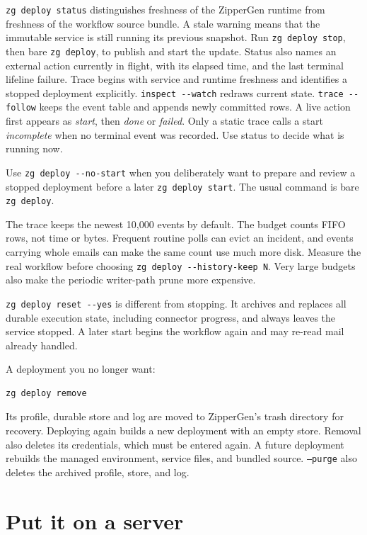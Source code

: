 \documentclass[11pt,a4paper]{article}
\begin{document}
\texttt{zg deploy status} distinguishes freshness of the ZipperGen runtime
from freshness of the workflow source bundle. A stale warning means that the
immutable service is still running its previous snapshot. Run \texttt{zg
deploy stop}, then bare \texttt{zg deploy}, to publish and start the update.
Status also names an external action currently in flight, with its elapsed
time, and the last terminal lifeline failure. Trace begins with service and
runtime freshness and identifies a stopped deployment explicitly.
\texttt{inspect -{}-watch} redraws current state. \texttt{trace -{}-follow}
keeps the event table and appends newly committed rows. A live action first
appears as \emph{start}, then \emph{done} or \emph{failed}. Only a static trace
calls a start \emph{incomplete} when no terminal event was recorded. Use status
to decide what is running now.

Use \texttt{zg deploy -{}-no-start} when you deliberately want to prepare and
review a stopped deployment before a later \texttt{zg deploy start}. The usual
command is bare \texttt{zg deploy}.

The trace keeps the newest 10,000 events by default. The budget counts FIFO
rows, not time or bytes. Frequent routine polls can evict an incident, and
events carrying whole emails can make the same count use much more disk.
Measure the real workflow before choosing
\texttt{zg deploy -{}-history-keep N}. Very large budgets also make the
periodic writer-path prune more expensive.

\texttt{zg deploy reset -{}-yes} is different from stopping. It archives and
replaces all durable execution state, including connector progress, and always
leaves the service stopped. A later start begins the workflow again and may
re-read mail already handled.

A deployment you no longer want:

\begin{lstlisting}[style=shell]
zg deploy remove
\end{lstlisting}

Its profile, durable store and log are moved to ZipperGen's trash directory
for recovery. Deploying again builds a new deployment with an empty store.
Removal also deletes its credentials, which must be entered again. A future
deployment rebuilds the managed environment, service files, and bundled
source. \texttt{--purge} also deletes the archived profile, store, and log.

\section{Put it on a server}
\end{document}
